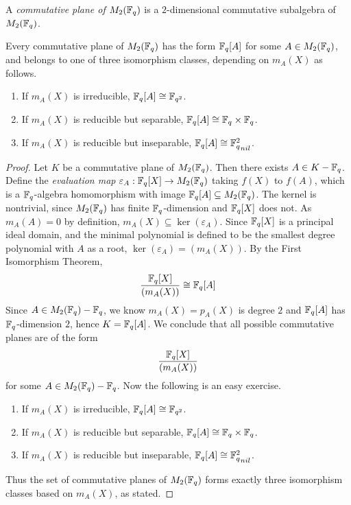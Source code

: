 \documentclass{amsart}
\begin{document}
    \begin{defn}
        A {\it commutative plane of $M_2(\protect\mathbb{F}_q)$} is a $2$-dimensional commutative subalgebra of $M_2(\protect\mathbb{F}_q)$.
    \end{defn}

    \begin{theorem}
        Every commutative plane of $M_2(\protect\mathbb{F}_q)$ has the form $\protect\mathbb{F}_q[A]$ for some $A \in M_2(\protect\mathbb{F}_q)$, and belongs to one of three isomorphism classes, depending on $m_A(X)$ as follows.
        \begin{enumerate}
            \item If $m_A(X)$ is irreducible, $\protect\mathbb{F}_q[A] \cong \protect\mathbb{F}_{q^2}$.
            \item If $m_A(X)$ is reducible but separable, $\protect\mathbb{F}_q[A] \cong \protect\mathbb{F}_q \times \protect\mathbb{F}_q$.
            \item If $m_A(X)$ is reducible but inseparable, $\bF_q[A] \cong {\bF_q^2}_{nil}$.
        \end{enumerate}
    \end{theorem}

    \begin{proof}
        Let $K$ be a commutative plane of $M_2(\protect\mathbb{F}_q)$. Then there exists $A \in K - \protect\mathbb{F}_q$. Define the {\it evaluation map} $\varepsilon_A : \protect\mathbb{F}_q[X] \rightarrow M_2(\protect\mathbb{F}_q)$ taking $f(X)$ to $f(A)$, which is a $\protect\mathbb{F}_q$-algebra homomorphism with image $\protect\mathbb{F}_q[A] \subseteq M_2(\protect\mathbb{F}_q)$. The kernel is nontrivial, since $M_2(\protect\mathbb{F}_q)$ has finite $\protect\mathbb{F}_q$-dimension and $\protect\mathbb{F}_q[X]$ does not. As $m_A(A) = 0$ by definition, $m_A(X) \subseteq \ker(\varepsilon_A)$. Since $\protect\mathbb{F}_q[X]$ is a principal ideal domain, and the minimal polynomial is defined to be the smallest degree polynomial with $A$ as a root, $\ker(\varepsilon_A) = (m_A(X))$. By the First Isomorphism Theorem,
        \begin{align*}
            \frac{\protect\mathbb{F}_q[X]}{(m_A(X))} \cong \protect\mathbb{F}_q[A]
        \end{align*}
        Since $A \in M_2(\protect\mathbb{F}_q) - \protect\mathbb{F}_q$, we know $m_A(X) = p_A(X)$ is degree $2$ and $\protect\mathbb{F}_q[A]$ has $\protect\mathbb{F}_q$-dimension $2$, hence $K=\protect\mathbb{F}_q[A]$. We conclude that all possible commutative planes are of the form
        \begin{align*}
            \frac{\protect\mathbb{F}_q[X]}{(m_A(X))}
        \end{align*}
        for some $A \in M_2(\protect\mathbb{F}_q) - \protect\mathbb{F}_q$. Now the following is an easy exercise.
        \begin{enumerate}
            \item If $m_A(X)$ is irreducible, $\protect\mathbb{F}_q[A] \cong \protect\mathbb{F}_{q^2}$.
            \item If $m_A(X)$ is reducible but separable, $\protect\mathbb{F}_q[A] \cong \protect\mathbb{F}_q \times \protect\mathbb{F}_q$.
            \item If $m_A(X)$ is reducible but inseparable, $\bF_q[A] \cong {\bF_q^2}_{nil}$.
        \end{enumerate}
        Thus the set of commutative planes of $M_2(\protect\mathbb{F}_q)$ forms exactly three isomorphism classes based on $m_A(X)$, as stated.
    \end{proof}
\end{document}
